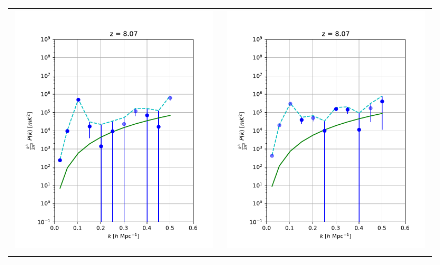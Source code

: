 \begin{figure}
\begin{tabular}{ll}
\includegraphics[scale=0.5]{chapters/psa128_pol/figures/pId_I.pdf} &
\includegraphics[scale=0.5]{chapters/psa128_pol/figures/pId_Q.pdf} \\

\end{tabular}
\end{figure}

